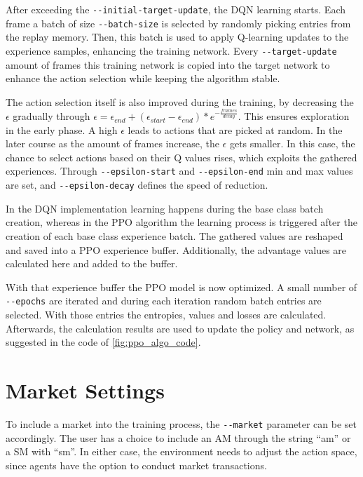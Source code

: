 After exceeding the \verb|--initial-target-update|, the DQN learning starts. Each frame a batch of size \verb|--batch-size| is selected by randomly picking entries from the replay memory. Then, this batch is used to apply Q-learning updates to the experience samples, enhancing the training network. Every \verb|--target-update| amount of frames this training network is copied into the target network to enhance the action selection while keeping the algorithm stable.

The action selection itself is also improved during the training, by decreasing the $\epsilon$ gradually through $\epsilon = \epsilon_{end}+(\epsilon_{start}-\epsilon_{end})*e^{-\frac{frames}{decay}}$. This ensures exploration in the early phase. A high $\epsilon$ leads to actions that are picked at random. In the later course as the amount of frames increase, the $\epsilon$ gets smaller. In this case, the chance to select actions based on their Q values rises, which exploits the gathered experiences. Through \verb|--epsilon-start| and \verb|--epsilon-end| min and max values are set, and \verb|--epsilon-decay| defines the speed of reduction.

In the DQN implementation learning happens during the base class batch creation, whereas in the PPO algorithm the learning process is triggered after the creation of each base class experience batch. The gathered values are reshaped and saved into a PPO experience buffer. Additionally, the advantage values are calculated here and added to the buffer.

With that experience buffer the PPO model is now optimized. A small number of \verb|--epochs| are iterated and during each iteration random batch entries are selected. With those entries the entropies, values and losses are calculated. Afterwards, the calculation results are used to update the policy and network, as suggested in the code of \ref{fig:ppo_algo_code}.

\section{Market Settings}\label{market_settings}
To include a market into the training process, the \verb|--market| parameter can be set accordingly. The user has a choice to include an AM through the string ``am'' or a SM with ``sm''. In either case, the environment needs to adjust the action space, since agents have the option to conduct market transactions.


